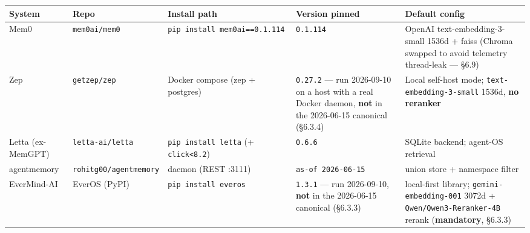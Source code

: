 \documentclass[
]{article}
\newcounter{none} %
\begin{document}
{\def\LTcaptype{none} %
\begin{longtable}[]{@{}
  >{\raggedright\arraybackslash}p{}
  >{\raggedright\arraybackslash}p{}
  >{\raggedright\arraybackslash}p{}
  >{\raggedright\arraybackslash}p{}
  >{\raggedright\arraybackslash}p{}@{}}
\toprule\noalign{}
\begin{minipage}[b]{\linewidth}\raggedright
System
\end{minipage} & \begin{minipage}[b]{\linewidth}\raggedright
Repo
\end{minipage} & \begin{minipage}[b]{\linewidth}\raggedright
Install path
\end{minipage} & \begin{minipage}[b]{\linewidth}\raggedright
Version pinned
\end{minipage} & \begin{minipage}[b]{\linewidth}\raggedright
Default config
\end{minipage} \\
\midrule\noalign{}
\endhead
\bottomrule\noalign{}
\endlastfoot
Mem0 & \texttt{mem0ai/mem0} & \texttt{pip\ install\ mem0ai==0.1.114} &
\texttt{0.1.114} & OpenAI text-embedding-3-small 1536d + faiss (Chroma
swapped to avoid telemetry thread-leak --- §6.9) \\
Zep & \texttt{getzep/zep} & Docker compose (zep + postgres) &
\texttt{0.27.2} --- run 2026-09-10 on a host with a real Docker daemon,
\textbf{not} in the 2026-06-15 canonical (§6.3.4) & Local self-host
mode; \texttt{text-embedding-3-small} 1536d, \textbf{no reranker} \\
Letta (ex-MemGPT) & \texttt{letta-ai/letta} &
\texttt{pip\ install\ letta} (+ \texttt{click\textless{}8.2}) &
\texttt{0.6.6} & SQLite backend; agent-OS retrieval \\
agentmemory & \texttt{rohitg00/agentmemory} & daemon (REST :3111) &
\texttt{as-of\ 2026-06-15} & union store + namespace filter \\
EverMind-AI & EverOS (PyPI) & \texttt{pip\ install\ everos} &
\texttt{1.3.1} --- run 2026-09-10, \textbf{not} in the 2026-06-15
canonical (§6.3.3) & local-first library; \texttt{gemini-embedding-001}
3072d + \texttt{Qwen/Qwen3-Reranker-4B} rerank (\textbf{mandatory},
§6.3.3) \\
\end{longtable}
}
\end{document}
